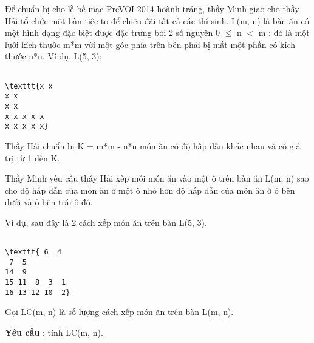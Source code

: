 Để chuẩn bị cho lễ bế mạc PreVOI 2014 hoành tráng, thầy Minh giao cho thầy Hải tổ chức một bàn tiệc to để chiêu đãi tất cả các thí sinh. L(m, n) là bàn ăn có một hình dạng đặc biệt được đặc trưng bởi 2 số nguyên 0  $\le$  n $<$ m : đó là một lưới kích thước m*m với một góc phía trên bên phải bị mất một phần có kích thước n*n. Ví dụ, L(5, 3):
\begin{verbatim}

\texttt{x x
x x
x x
x x x x x
x x x x x}\end{verbatim}

Thầy Hải chuẩn bị K = m*m - n*n món ăn có độ hấp dẫn khác nhau và có giá trị từ 1 đến K.

Thầy Minh yêu cầu thầy Hải xếp mỗi món ăn vào một ô trên bàn ăn L(m, n) sao cho độ hấp dẫn của món ăn ở một ô nhỏ hơn độ hấp dẫn của món ăn ở ô bên dưới và ô bên trái ô đó.

Ví dụ, sau đây là 2 cách xếp món ăn trên bàn L(5, 3).
\begin{verbatim}

\texttt{ 6  4
 7  5
14  9
15 11  8  3  1
16 13 12 10  2}\end{verbatim}

Gọi LC(m, n) là số lượng cách xếp món ăn trên bàn L(m, n).

\textbf{Yêu cầu } : tính LC(m, n).

\